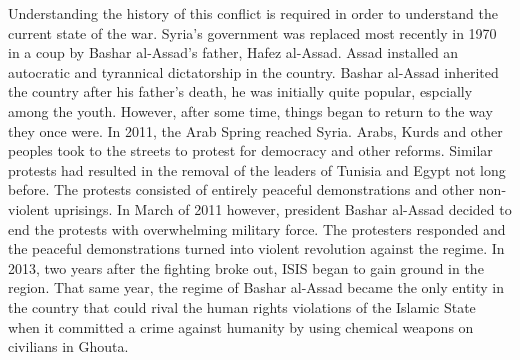 \documentclass[a4paper,titlepage,12pt]{turabian-researchpaper}
\begin{document}
Understanding the history of this conflict is required in order to understand
the current state of the war. Syria's government was replaced most recently in
1970 in a coup by Bashar al-Assad's father, Hafez al-Assad. Assad installed an
autocratic and tyrannical dictatorship in the country. Bashar al-Assad
inherited the country after his father's death, he was initially quite popular,
espcially among the youth. However, after some time, things began to return to
the way they once were. In 2011, the Arab Spring reached
Syria. Arabs, Kurds and other peoples took to the streets to protest for
democracy and other reforms. Similar protests
had resulted in the removal of the leaders of Tunisia and Egypt not long
before. The protests consisted of entirely peaceful demonstrations and other
non-violent uprisings. In March of 2011 however, president Bashar al-Assad
decided to end the protests with overwhelming military force. The protesters
responded and the peaceful demonstrations turned into violent revolution against the
regime. \autocite[1-3]{overview} In 2013, two years after the fighting broke
out, ISIS began to gain ground in the region. That same year, the regime of
Bashar al-Assad became the only entity in the country that could rival the
human rights violations of the Islamic State when it committed a crime against
humanity by using chemical weapons on civilians in Ghouta.
\autocite{revolution}
\end{document}
